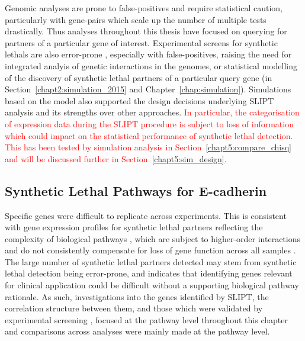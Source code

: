 Genomic analyses are prone to false-positives and require statistical caution, particularly with gene-pairs which scale up the number of multiple tests drastically. %
Thus analyses throughout this thesis have focused on querying for partners of a particular gene of interest. 
Experimental screens for \glspl{synthetic lethal} are also error-prone \citep{Lu2015, Fece2015, Lord2014}, especially with false-positives, raising the need for integrated analyis of genetic interactions in the \glspl{genome}, or statistical modelling of the discovery of \gls{synthetic lethal} partners of a particular query gene (in Section~\ref{chapt2:simulation_2015} and Chapter~\ref{chap:simulation}). Simulations based on the model also supported the design decisions underlying \gls{SLIPT} analysis and its strengths over other approaches. \textcolor{red}{In particular, the categorisation of expression data during the \gls{SLIPT} procedure is subject to loss of information which could impact on the statistical performance of synthetic lethal detection. This has been tested by simulation analysis in Section~\ref{chapt5:compare_chisq} and will be discussed further in Section~\ref{chapt5:sim_design}.}

\subsection{Synthetic Lethal Pathways for E-cadherin}

Specific genes were difficult to replicate across experiments. This is consistent with \gls{gene expression} profiles for \gls{synthetic lethal} partners reflecting the complexity of biological \glspl{pathway} \citep{Perou2000}, which are subject to higher-order interactions and do not consistently compensate for loss of gene function across all samples \citep{Jerby2014, Lu2015}. %
The large number of \gls{synthetic lethal} partners detected may stem from \gls{synthetic lethal} detection being error-prone, and indicates that identifying genes relevant for clinical application could be difficult without a supporting biological \gls{pathway} rationale. As such, investigations into the genes identified by \gls{SLIPT}, the correlation structure between them, and those which were validated by experimental screening \citep{Telford2015}, focused at the \gls{pathway} level throughout this chapter and comparisons across analyses were mainly made at the \gls{pathway} level. %

